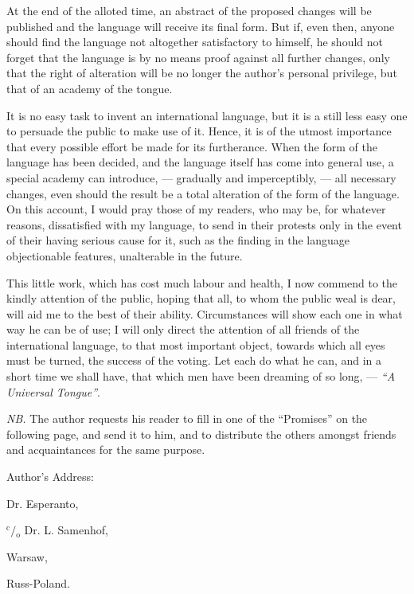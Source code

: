 At the end of the alloted time, an abstract of the proposed changes will be published and the language will receive its final form. But if, even then, anyone should find the language not altogether satisfactory to himself, he should not forget that the language is by no means proof against all further changes, only that the right of alteration will be no longer the author’s personal privilege, but that of an academy of the tongue.

It is no easy task to invent an international language, but it is a still less easy one to persuade the public to make use of it. Hence, it is of the utmost importance that every possible effort be made for its furtherance. When the form of the language has been decided, and the language itself has come into general use, a special academy can introduce, --- gradually and imperceptibly, --- all necessary changes, even should the result be a total alteration of the form of the language. On this account, I would pray those of my readers, who may be, for whatever reasons, dissatisfied with my language, to send in their protests only in the event of their having serious cause for it, such as the finding in the language objectionable features, unalterable in the future.

This little work, which has cost much labour and health, I now commend to the kindly attention of the public, hoping that all, to whom the public weal is dear, will aid me to the best of their ability. Circumstances will show each one in what way he can be of use; I will only direct the attention of all friends of the international language, to that most important object, towards which all eyes must be turned, the success of the voting. Let each do what he can, and in a short time we shall have, that which men have been dreaming of so long, --- \emph{``A Universal Tongue''}.

\sectionline

\clearpage

\emph{NB.} The author requests his reader to fill in one of the ``Promises'' on the following page, and send it to him, and to distribute the others amongst friends and acquaintances for the same purpose.

Author's Address:

\vspace{1ex}

\hspace{1.5em} Dr. Esperanto,

\vspace{1ex}

\hspace{3em} $\mathrm{^c\!/\!_o}$ Dr. L. Samenhof,

\vspace{1ex}

\hspace{4.5em} Warsaw,

\vspace{1ex}

\hspace{6em} Russ-Poland.

\sectionline
